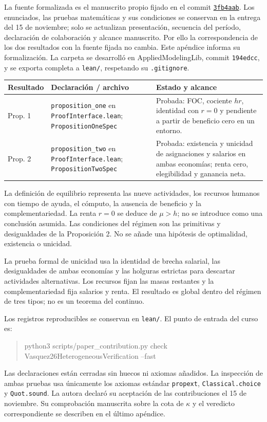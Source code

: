 La fuente formalizada es el manuscrito propio fijado en el commit
\href{https://github.com/sbvasquezg-ux/ai-project/commit/3fb4aab2a2064fb39fa79d48bcfcbc49eb7920fd}{\texttt{3fb4aab}}.
Los enunciados, las pruebas matemáticas y sus condiciones se conservan en la entrega del 15 de noviembre; solo se actualizan presentación, secuencia del período, declaración de colaboración y alcance manuscrito. Por ello la correspondencia de los dos resultados con la fuente fijada no cambia. Este apéndice informa su formalización. La carpeta se desarrolló en AppliedModelingLib, commit \texttt{194edcc}, y se exporta completa a \texttt{lean/}, respetando su \texttt{.gitignore}.
\begin{center}\small
\begin{tabular}{>{\raggedright\arraybackslash}p{.16\linewidth}>{\raggedright\arraybackslash}p{.35\linewidth}>{\raggedright\arraybackslash}p{.39\linewidth}}\toprule
Resultado & Declaración / archivo & Estado y alcance\\\midrule
Prop. 1 & \texttt{proposition\_one} en \texttt{ProofInterface.lean}; \texttt{PropositionOneSpec} & Probada: FOC, cociente $hr$, identidad con $r=0$ y pendiente a partir de beneficio cero en un entorno.\\[5pt]
Prop. 2 & \texttt{proposition\_two} en \texttt{ProofInterface.lean}; \texttt{PropositionTwoSpec} & Probada: existencia y unicidad de asignaciones y salarios en ambas economías; renta cero, elegibilidad y ganancia neta.\\\bottomrule
\end{tabular}
\end{center}
La definición de equilibrio representa las nueve actividades, los recursos humanos con tiempo de ayuda, el cómputo, la ausencia de beneficio y la complementariedad. La renta $r=0$ se deduce de $\mu>h$; no se introduce como una conclusión asumida. Las condiciones del régimen son las primitivas y desigualdades de la Proposición 2. No se añade una hipótesis de optimalidad, existencia o unicidad.

La prueba formal de unicidad usa la identidad de brecha salarial, las desigualdades de ambas economías y las holguras estrictas para descartar actividades alternativas. Los recursos fijan las masas restantes y la complementariedad fija salarios y renta. El resultado es global dentro del régimen de tres tipos; no es un teorema del continuo.

Los registros reproducibles se conservan en \texttt{lean/}. El punto de entrada del curso es:
\begin{quote}\small\ttfamily
python3 scripts/paper\_contribution.py check\\
\hspace*{1em}Vasquez26HeterogeneousVerification --fast
\end{quote}
Las declaraciones están cerradas sin huecos ni axiomas añadidos. La inspección de ambas pruebas usa únicamente los axiomas estándar \texttt{propext}, \texttt{Classical.choice} y \texttt{Quot.sound}. La autora declaró su aceptación de las contribuciones el 15 de noviembre. Su comprobación manuscrita sobre la cota de $\kappa$ y el veredicto correspondiente se describen en el último apéndice.

